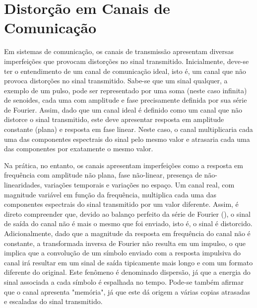 \section{Distorção em Canais de Comunicação}
\label{sec:distorcao_em_canais}

Em sistemas de comunicação, os canais de transmissão apresentam diversas imperfeições que provocam distorções no sinal transmitido. Inicialmente, deve-se ter o entendimento de um canal de comunicação ideal, isto é, um canal que não provoca distorções no sinal transmitido. Sabe-se que um sinal qualquer, a exemplo de um pulso, pode ser representado por uma soma (neste caso infinita) de senoides, cada uma com amplitude e fase precisamente definida por sua série de Fourier. Assim, dado que um canal ideal é definido como um canal que não distorce o sinal transmitido, este deve apresentar resposta em amplitude constante (plana) e resposta em fase linear. Neste caso, o canal multiplicaria cada uma das componentes espectrais do sinal pelo mesmo valor e atrasaria cada uma das componentes por exatamente o mesmo valor. 

Na prática, no entanto, os canais apresentam imperfeições como a resposta em frequência com amplitude não plana, fase não-linear, presença de não-linearidades, variações temporais e variações no espaço. Um canal real, com magnitude variável em função da frequência, multiplica cada uma das componentes espectrais do sinal transmitido por um valor diferente. Assim, é direto compreender que, devido ao balanço perfeito da série de Fourier (\cite{lathi2009}), o sinal de saída do canal não é mais o mesmo que foi enviado, isto é, o sinal é distorcido. Adicionalmente, dado que a magnitude da resposta em frequência do canal não é constante, a transformada inversa de Fourier não resulta em um impulso, o que implica que a convolução de um símbolo enviado com a resposta impulsiva do canal irá resultar em um sinal de saída tipicamente mais longo e com um formato diferente do original. Este fenômeno é denominado dispersão, já que a energia do sinal associada a cada símbolo é espalhada no tempo. Pode-se também afirmar que o canal apresenta "memória", já que este dá origem a várias copias atrasadas e escaladas do sinal transmitido.

